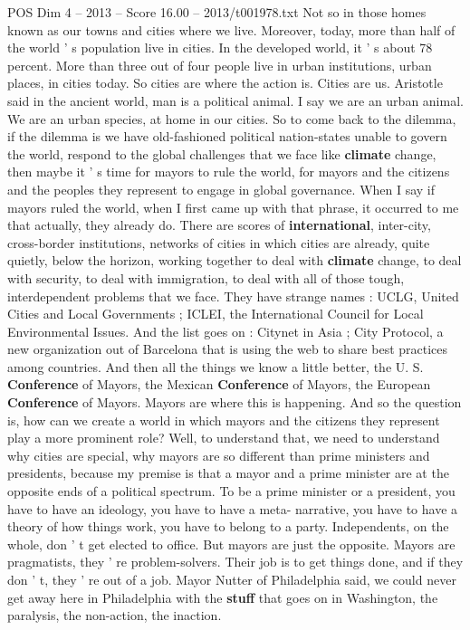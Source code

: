 \begin{textsample}{POS Dim 4 – 2013 – Score 16.00 – 2013/t001978.txt}
Not so in those homes known as our towns and cities where we live.
Moreover, today, more than half of the world ' s population live in cities.
In the developed world, it ' s about 78 percent.
More than three out of four people live in urban institutions, urban places, in cities today.
So cities are where the action is.
Cities are us.
Aristotle said in the ancient world, man is a political animal.
I say we are an urban animal.
We are an urban species, at home in our cities.
So to come back to the dilemma, if the dilemma is we have old-fashioned political nation-states unable to govern the world, respond to the global challenges that we face like \textbf{climate} change, then maybe it ' s time for mayors to rule the world, for mayors and the citizens and the peoples they represent to engage in global governance.
When I say if mayors ruled the world, when I first came up with that phrase, it occurred to me that actually, they already do.
There are scores of \textbf{international}, inter-city, cross-border institutions, networks of cities in which cities are already, quite quietly, below the horizon, working together to deal with \textbf{climate} change, to deal with security, to deal with immigration, to deal with all of those tough, interdependent problems that we face.
They have strange names : UCLG, United Cities and Local Governments ; ICLEI, the International Council for Local Environmental Issues.
And the list goes on : Citynet in Asia ; City Protocol, a new organization out of Barcelona that is using the web to share best practices among countries.
And then all the things we know a little better, the U.
S. \textbf{Conference} of Mayors, the Mexican \textbf{Conference} of Mayors, the European \textbf{Conference} of Mayors.
Mayors are where this is happening.
And so the question is, how can we create a world in which mayors and the citizens they represent play a more prominent role?
Well, to understand that, we need to understand why cities are special, why mayors are so different than prime ministers and presidents, because my premise is that a mayor and a prime minister are at the opposite ends of a political spectrum.
To be a prime minister or a president, you have to have an ideology, you have to have a meta- narrative, you have to have a theory of how things work, you have to belong to a party.
Independents, on the whole, don ' t get elected to office.
But mayors are just the opposite.
Mayors are pragmatists, they ' re problem-solvers.
Their job is to get things done, and if they don ' t, they ' re out of a job.
Mayor Nutter of Philadelphia said, we could never get away here in Philadelphia with the \textbf{stuff} that goes on in Washington, the paralysis, the non-action, the inaction.

\end{textsample}
